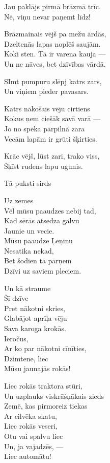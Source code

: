 \documentclass[14pt]{extarticle}
\begin{document}
{{Jau paklājs pirmā brāzmā trīc.\\
Nē, viņu nevar paņemt līdz!

Brāzmainais vējš pa mežu ārdās,\\
Dzeltenās lapas noplēš saujām.\\
Koki sten. Tā ir varena kauja ---\\
Un ne nāves, bet dzīvības vārdā.

SImt pumpuru slēpj katrs zars,\\
Un viņiem pieder pavasars.

Katrs nākošais vēju cirtiens\\
Kokus ņem ciešāk savā varā ---\\
Jo no spēka pārpilnā zara\\
Vecām lapām ir grūti šķirties.

Krāc vējš, lūst zari, trako viss,\\
Šķīst rudens lapu ugunis.


\newpage

{\large \sc Tā puksti sirds}

Uz zemes\\
Vēl mūsu paaudzes nebij tad,\\
Kad sērās atsedza galvu\\
Jaunie un vecie.\\
Mūsu paaudze Ļeņinu\\
Nesatika nekad,\\
Bet šodien tā pārņem\\
Dzīvi uz saviem pleciem.

Un kā straume\\
Šī dzīve\\
Pret nākotni skries,\\
Glabājot aprīļa vēju\\
Sava karoga krokās.\\
Ieročus,\\
Ar ko par nākotni cīnīties,\\
Dzimtene, liec\\
Mūsu jaunajās rokās!

Liec rokās traktora stūri,\\
Un uzplauks viskrāšņākais zieds\\
Zemē, kas pirmoreiz tiekas\\
Ar cilvēka skatu,\\
Liec rokās veseri,\\
Otu vai spalvu liec\\
Un, ja vajadzēs, ---\\
Liec automātu!

}}
\end{document}
